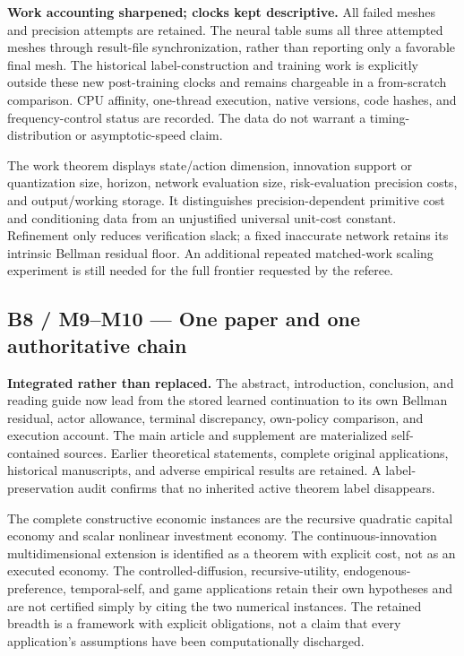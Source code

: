 \documentclass[
  11pt,
]{article}
\begin{document}
\textbf{Work accounting sharpened; clocks kept descriptive.} All failed
meshes and precision attempts are retained. The neural table sums all
three attempted meshes through result-file synchronization, rather than
reporting only a favorable final mesh. The historical label-construction
and training work is explicitly outside these new post-training clocks
and remains chargeable in a from-scratch comparison. CPU affinity,
one-thread execution, native versions, code hashes, and
frequency-control status are recorded. The data do not warrant a
timing-distribution or asymptotic-speed claim.

The work theorem displays state/action dimension, innovation support or
quantization size, horizon, network evaluation size, risk-evaluation
precision costs, and output/working storage. It distinguishes
precision-dependent primitive cost and conditioning data from an
unjustified universal unit-cost constant. Refinement only reduces
verification slack; a fixed inaccurate network retains its intrinsic
Bellman residual floor. An additional repeated matched-work scaling
experiment is still needed for the full frontier requested by the
referee.

\hypertarget{b8-m9m10-one-paper-and-one-authoritative-chain}{%
\subsection{B8 / M9--M10 --- One paper and one authoritative
chain}\label{b8-m9m10-one-paper-and-one-authoritative-chain}}

\textbf{Integrated rather than replaced.} The abstract, introduction,
conclusion, and reading guide now lead from the stored learned
continuation to its own Bellman residual, actor allowance, terminal
discrepancy, own-policy comparison, and execution account. The main
article and supplement are materialized self-contained sources. Earlier
theoretical statements, complete original applications, historical
manuscripts, and adverse empirical results are retained. A
label-preservation audit confirms that no inherited active theorem label
disappears.

The complete constructive economic instances are the recursive quadratic
capital economy and scalar nonlinear investment economy. The
continuous-innovation multidimensional extension is identified as a
theorem with explicit cost, not as an executed economy. The
controlled-diffusion, recursive-utility, endogenous-preference,
temporal-self, and game applications retain their own hypotheses and are
not certified simply by citing the two numerical instances. The retained
breadth is a framework with explicit obligations, not a claim that every
application's assumptions have been computationally discharged.
\end{document}
